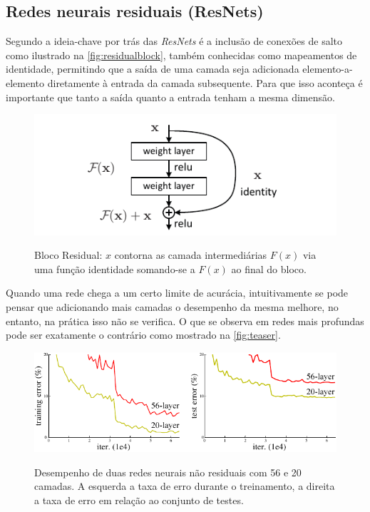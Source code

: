		\subsection{Redes neurais residuais (ResNets)}
			\par Segundo \cite{DBLP:journals/corr/HeZRS15} a ideia-chave por trás das \textit{ResNets} é a inclusão de conexões de salto como ilustrado na  \autoref{fig:residualblock}, também conhecidas como mapeamentos de identidade, permitindo que a saída de uma camada seja adicionada elemento-a-elemento diretamente à entrada da camada subsequente. Para que isso aconteça é importante que tanto a saída quanto a entrada tenham a mesma dimensão.
			
			\begin{figure}[H]
				\centering
				\caption[Bloco residual]{Bloco Residual: $x$ contorna as camada intermediárias $F(x)$ via uma função identidade somando-se a $F(x)$ ao final do bloco.}
				\includegraphics[width=0.7\linewidth]{images/residualBlock}
				\label{fig:residualblock}
			\end{figure}
			
			
			\par Quando uma rede chega a um certo limite de acurácia, intuitivamente se pode pensar que adicionando mais camadas o desempenho da mesma melhore, no entanto, na prática isso não se verifica. O que se observa em redes mais profundas pode ser exatamente o contrário como mostrado na \autoref{fig:teaser}.
			
			\begin{figure}[H]
				\centering
				\caption[Comparação de redes profundas não residuais]{Desempenho de duas redes neurais não residuais com 56 e 20 camadas. A esquerda a taxa de erro durante o treinamento, a direita a taxa de erro em relação ao conjunto de testes.}
				\includegraphics[width=0.7\linewidth]{images/teaser}
				\label{fig:teaser}
			\end{figure}
			
